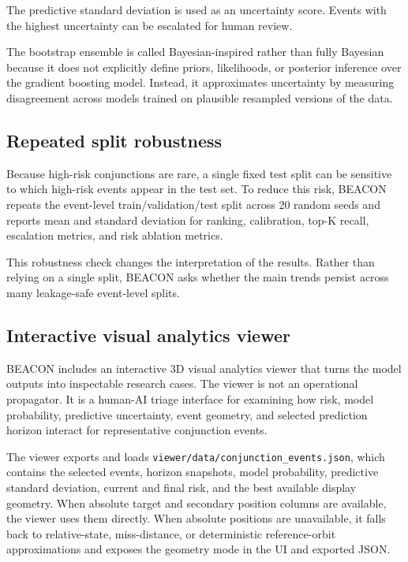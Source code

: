\documentclass[11pt]{article}
\begin{document}
The predictive standard deviation is used as an uncertainty score. Events with the highest uncertainty can be escalated for human review.

The bootstrap ensemble is called Bayesian-inspired rather than fully Bayesian because it does not explicitly define priors, likelihoods, or posterior inference over the gradient boosting model. Instead, it approximates uncertainty by measuring disagreement across models trained on plausible resampled versions of the data.

\subsection{Repeated split robustness}

Because high-risk conjunctions are rare, a single fixed test split can be sensitive to which high-risk events appear in the test set. To reduce this risk, BEACON repeats the event-level train/validation/test split across 20 random seeds and reports mean and standard deviation for ranking, calibration, top-K recall, escalation metrics, and risk ablation metrics.

This robustness check changes the interpretation of the results. Rather than relying on a single split, BEACON asks whether the main trends persist across many leakage-safe event-level splits.

\subsection{Interactive visual analytics viewer}

BEACON includes an interactive 3D visual analytics viewer that turns the model outputs into inspectable research cases. The viewer is not an operational propagator. It is a human-AI triage interface for examining how risk, model probability, predictive uncertainty, event geometry, and selected prediction horizon interact for representative conjunction events.

The viewer exports and loads \texttt{viewer/data/conjunction\_events.json}, which contains the selected events, horizon snapshots, model probability, predictive standard deviation, current and final risk, and the best available display geometry. When absolute target and secondary position columns are available, the viewer uses them directly. When absolute positions are unavailable, it falls back to relative-state, miss-distance, or deterministic reference-orbit approximations and exposes the geometry mode in the UI and exported JSON.
\end{document}
